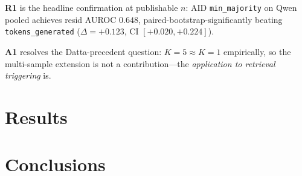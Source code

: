 \documentclass[11pt]{article}
\begin{document}
\textbf{R1} is the headline confirmation at publishable $n$:
AID \texttt{min\_majority} on Qwen pooled achieves resid AUROC
$0.648$, paired-bootstrap-significantly beating
\texttt{tokens\_generated}
($\Delta = +0.123$, CI $[+0.020, +0.224]$).

\textbf{A1} resolves the Datta-precedent question: $K{=}5 \approx
K{=}1$ empirically, so the multi-sample extension is not a
contribution---the \emph{application to retrieval triggering} is.


\section{Results}



\section{Conclusions}



%
%
%
%
%
\end{document}
